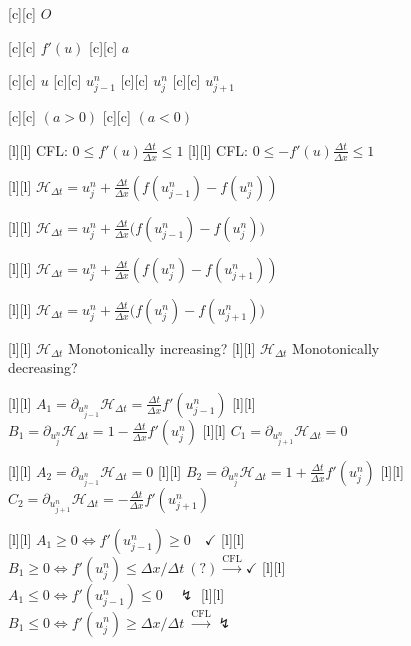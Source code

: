 \begin{figure}[ht]
	\centering
	\footnotesize

	[c] {$O$}

	[c] {$f'(u)$}
	[c] {$a$}

	[c] {$u$}
	[c] {$u^{n}_{j-1}$}
	[c] {$u^{n}_{j}$}
	[c] {$u^{n}_{j+1}$}

	[c] {$(a>0)$}
	[c] {$(a<0)$}

	[l] {CFL: $\displaystyle 0\leq f'(u)\frac{\Delta t}{\Delta x} \leq 1$}
	[l] {CFL: $\displaystyle 0\leq -f'(u)\frac{\Delta t}{\Delta x} \leq 1$}

	[l] {$\displaystyle  \mathcal{H}_{\Delta t}
			= u^{n}_{j} + \frac{\Delta t}{\Delta x}\left(f(u^{n}_{j-1}) - f(u^{n}_{j})\right)$}

	[l] {$\displaystyle  \mathcal{H}_{\Delta t}
			= u^{n}_{j} + \frac{\Delta t}{\Delta x}\Big(f(u^{n}_{j-1}) - f(u^{n}_{j})\Big)$}

	[l] {$\displaystyle  \mathcal{H}_{\Delta t}
			= u^{n}_{j} + \frac{\Delta t}{\Delta x}\left(f(u^{n}_{j}) - f(u^{n}_{j+1})\right)$}

	[l] {$\displaystyle  \mathcal{H}_{\Delta t}
			= u^{n}_{j} + \frac{\Delta t}{\Delta x}\Big(f(u^{n}_{j}) - f(u^{n}_{j+1})\Big)$}

	[l] {$\mathcal{H}_{\Delta t}$ Monotonically increasing?}
	[l] {$\mathcal{H}_{\Delta t}$ Monotonically decreasing?}

	[l] {$\displaystyle A_{1} = \partial_{u^{n}_{j-1}} \mathcal{H}_{\Delta t}
			= \frac{\Delta t}{\Delta x}f'(u^{n}_{j-1})$}
	[l] {$\displaystyle B_{1} = \partial_{u^{n}_{j}} \mathcal{H}_{\Delta t}
			= 1 - \frac{\Delta t}{\Delta x}f'(u^{n}_{j})$}
	[l] {$\displaystyle C_{1} = \partial_{u^{n}_{j+1}} \mathcal{H}_{\Delta t} = 0$}

	[l] {$\displaystyle A_{2} = \partial_{u^{n}_{j-1}} \mathcal{H}_{\Delta t}
			= 0$}
	[l] {$\displaystyle B_{2} = \partial_{u^{n}_{j}} \mathcal{H}_{\Delta t}
			= 1 + \frac{\Delta t}{\Delta x}f'(u^{n}_{j})$}
	[l] {$\displaystyle C_{2} = \partial_{u^{n}_{j+1}} \mathcal{H}_{\Delta t} =
			-\frac{\Delta t}{\Delta x}f'(u^{n}_{j+1})$}

	[l] {$A_{1}\geq 0 \Leftrightarrow f'(u^{n}_{j-1}) \geq 0\quad \checkmark$}
	[l] {$B_{1}\geq 0 \Leftrightarrow f'(u^{n}_{j}) \leq \Delta x/\Delta t \ (?)\stackrel{\text{CFL}}{\rightarrow}\checkmark$}
	[l] {$A_{1}\leq 0 \Leftrightarrow f'(u^{n}_{j-1}) \leq 0\quad \lightning$}
	[l] {$B_{1}\leq 0 \Leftrightarrow f'(u^{n}_{j}) \geq \Delta x/\Delta t \ \stackrel{\text{CFL}}{\rightarrow}\lightning$}


\end{figure}
